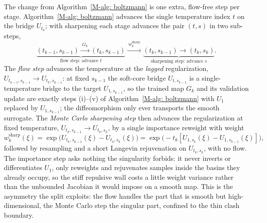 \documentclass{article}
\begin{document}
The change from Algorithm~\ref{M-alg: boltzmann} is one extra, flow-free step per stage. Algorithm~\ref{M-alg: boltzmann} advances the single temperature index $t$ on the bridge $U_{t_k}$; with sharpening each stage advances the pair $(t,s)$ in two sub-steps,
\begin{equation*}
    \underbrace{(t_{k-1},s_{k-1}) \xrightarrow{\ G_k\ } (t_k,s_{k-1})}_{\text{flow step: advance } t}
    \xrightarrow{\ w^{\mathrm{sharp}}_k\ }
    \underbrace{(t_k,s_{k-1}) \to (t_k,s_k)}_{\text{sharpening step: advance } s} .
\end{equation*}
The \emph{flow step} advances the temperature at the \emph{lagged} regularization, $U_{t_{k-1},s_{k-1}} \to U_{t_k,s_{k-1}}$: at fixed $s_{k-1}$ the soft-core bridge $U_{t,s_{k-1}}$ is a single-temperature bridge to the target $U_{1,s_{k-1}}$, so the trained map $G_k$ and its validation update are exactly steps (i)--(v) of Algorithm~\ref{M-alg: boltzmann} with $U_1$ replaced by $U_{1,s_{k-1}}$; the diffeomorphism only ever transports the smooth surrogate. The \emph{Monte Carlo sharpening step} then advances the regularization at fixed temperature, $U_{t_k,s_{k-1}} \to U_{t_k,s_k}$, by a single importance reweight with weight
\begin{equation}
    w^{\mathrm{sharp}}_k(\xi) = \exp\bigl(U_{t_k,s_{k-1}}(\xi) - U_{t_k,s_k}(\xi)\bigr)
    = \exp\bigl(-t_k[U_{1,s_k}(\xi) - U_{1,s_{k-1}}(\xi)]\bigr),
    \label{eq: sharpen-w}
\end{equation}
followed by resampling and a short Langevin rejuvenation on $U_{t_k,s_k}$, with no flow. The importance step asks nothing the singularity forbids: it never inverts or differentiates $U_1$, only reweights and rejuvenates samples inside the basins they already occupy, so the stiff repulsive wall costs a little weight variance rather than the unbounded Jacobian it would impose on a smooth map. This is the asymmetry the split exploits: the flow handles the part that is smooth but high-dimensional, the Monte Carlo step the singular part, confined to the thin clash boundary.
\end{document}
